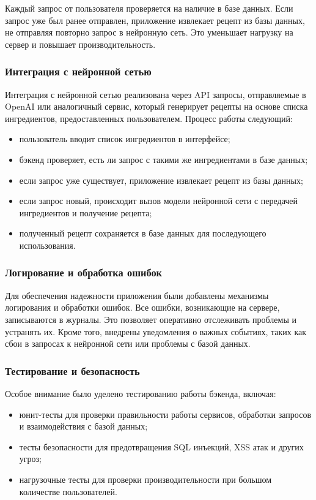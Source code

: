 {Каждый запрос от пользователя проверяется на наличие в базе данных. Если запрос уже был ранее отправлен, приложение извлекает рецепт из базы данных, не отправляя повторно запрос в нейронную сеть. Это уменьшает нагрузку на сервер и повышает производительность.

\subsubsection*{Интеграция с нейронной сетью}
Интеграция с нейронной сетью реализована через API запросы, отправляемые в OpenAI или аналогичный сервис, который генерирует рецепты на основе списка ингредиентов, предоставленных пользователем. Процесс работы следующий:
\begin{itemize}
    \item пользователь вводит список ингредиентов в интерфейсе;
    \item бэкенд проверяет, есть ли запрос с такими же ингредиентами в базе данных;
    \item если запрос уже существует, приложение извлекает рецепт из базы данных;
    \item если запрос новый, происходит вызов модели нейронной сети с передачей ингредиентов и получение рецепта;
    \item полученный рецепт сохраняется в базе данных для последующего использования.
\end{itemize}

\subsubsection*{Логирование и обработка ошибок}
Для обеспечения надежности приложения были добавлены механизмы логирования и обработки ошибок. Все ошибки, возникающие на сервере, записываются в журналы. Это позволяет оперативно отслеживать проблемы и устранять их. Кроме того, внедрены уведомления о важных событиях, таких как сбои в запросах к нейронной сети или проблемы с базой данных.

\subsubsection*{Тестирование и безопасность}
Особое внимание было уделено тестированию работы бэкенда, включая:
\begin{itemize}
    \item юнит-тесты для проверки правильности работы сервисов, обработки запросов и взаимодействия с базой данных;
    \item тесты безопасности для предотвращения SQL инъекций, XSS атак и других угроз;
    \item нагрузочные тесты для проверки производительности при большом количестве пользователей.
\end{itemize}

}
